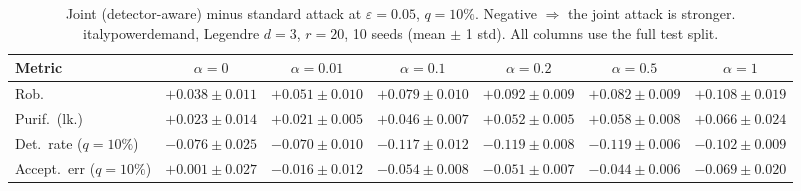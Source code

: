 \begin{table}[htbp]
  \centering
  \small
  \begin{tabular}{@{}lcccccc@{}}
    \toprule
    Metric & $\alpha{=}0$ & $\alpha{=}0.01$ & $\alpha{=}0.1$ & $\alpha{=}0.2$ & $\alpha{=}0.5$ & $\alpha{=}1$ \\
    \midrule
    Rob. & $+0.038 \pm 0.011$ & $+0.051 \pm 0.010$ & $+0.079 \pm 0.010$ & $+0.092 \pm 0.009$ & $+0.082 \pm 0.009$ & $+0.108 \pm 0.019$ \\
    Purif.\ (lk.) & $+0.023 \pm 0.014$ & $+0.021 \pm 0.005$ & $+0.046 \pm 0.007$ & $+0.052 \pm 0.005$ & $+0.058 \pm 0.008$ & $+0.066 \pm 0.024$ \\
    Det.\ rate ($q{=}10\%$) & $-0.076 \pm 0.025$ & $-0.070 \pm 0.010$ & $-0.117 \pm 0.012$ & $-0.119 \pm 0.008$ & $-0.119 \pm 0.006$ & $-0.102 \pm 0.009$ \\
    Accept.\ err ($q{=}10\%$) & $+0.001 \pm 0.027$ & $-0.016 \pm 0.012$ & $-0.054 \pm 0.008$ & $-0.051 \pm 0.007$ & $-0.044 \pm 0.006$ & $-0.069 \pm 0.020$ \\
    \bottomrule
  \end{tabular}
  \caption{Joint (detector-aware) minus standard attack at $\varepsilon=0.05$, $q{=}10\%$. Negative $\Rightarrow$ the joint attack is stronger. italypowerdemand, Legendre $d{=}3$, $r{=}20$, 10 seeds (mean $\pm$ 1 std). All columns use the full test split.}
  \label{tab:italypowerdemand_joint_r20_eps0.05}
\end{table}
